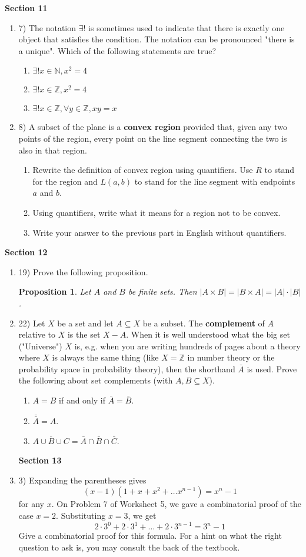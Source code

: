 \documentclass[11pt]{preprint}
\newtheorem{proposition}{Proposition}
\def\enumb{\begin{enumerate}}
\def\enume{\end{enumerate}}
\def\integers{\mathbb{Z}}
\begin{document}
\textbf{Section 11}
\enumb

\item[7)] The notation $\exists !$ is sometimes used to indicate that there is exactly one object that satisfies the condition. The notation can be pronounced "there is a unique". Which of the following statements are true?
\enumb
\item $\exists ! x\in\mathbb{N}, x^2=4$
\item $\exists ! x\in\integers, x^2=4$
\item $\exists ! x\in\integers,\forall y\in\integers, xy=x$
\enume
\item[8)] A subset of the plane is a \textbf{convex region} provided that, given any two points of the region, every point on the line segment connecting the two is also in that region.
\enumb
\item Rewrite the definition of convex region using quantifiers. Use $R$ to stand for the region and $L(a,b)$ to stand for the line segment with endpoints $a$ and $b$.
\item Using quantifiers, write what it means for a region not to be convex.
\item Write your answer to the previous part in English without quantifiers.
\enume
\enume

\textbf{Section 12}
\enumb
\item[19)] Prove the following proposition.

\begin{proposition}
Let $A$ and $B$ be finite sets. Then $|A\times B|=|B\times A|=|A|\cdot|B|$.
\end{proposition}

\item[22)] Let $X$ be a set and let $A\subseteq X$ be a subset. The \textbf{complement} of $A$ relative to $X$ is the set $X-A$. When it is well understood what the big set ("Universe") $X$ is, e.g. when you are writing hundreds of pages about a theory where $X$ is always the same thing (like $X=\integers$ in number theory or the probability space in  probability theory), then the shorthand $\bar{A}$ is used.  Prove the following about set complements (with $A,B\subseteq X$).
\enumb
\item $A=B$ if and only if $\bar{A}=\bar{B}$.
\item $\bar{\bar{A}}=A$.
\item $\overline{A\cup B\cup C}=\bar{A}\cap\bar{B}\cap\bar{C}$.
\enume

\textbf{Section 13}
\item[3)]Expanding the parentheses gives
\[
(x-1)(1+x+x^2+\dots x^{n-1}) = x^n-1
\]
for any $x$. On Problem 7 of Worksheet 5, we gave a combinatorial proof of the case $x=2$. Substituting $x=3$, we get
\[
2\cdot 3^0+ 2\cdot 3^1+\dots + 2\cdot 3^{n-1}=3^n-1
\]
Give a combinatorial proof for this formula. For a hint on what the right question to ask is, you may consult the back of the textbook.
\enume
\end{document}

